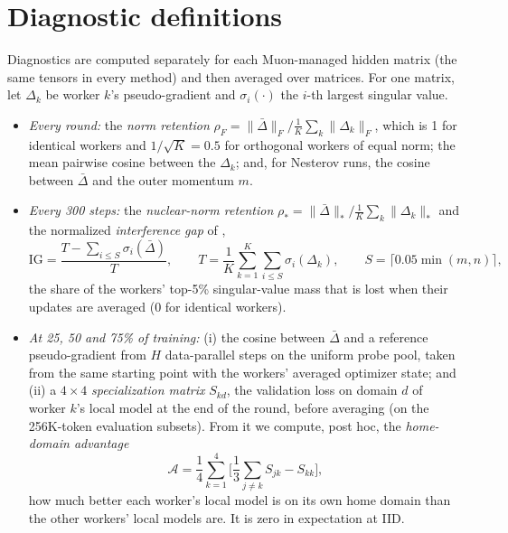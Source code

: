 \documentclass{article}
\begin{document}
\FloatBarrier  %
\section{Diagnostic definitions}\label{app:diagnostics}
Diagnostics are computed separately for each Muon-managed hidden matrix (the same tensors in every method) and then averaged over matrices. For one matrix, let $\Delta_k$ be worker $k$'s pseudo-gradient and $\sigma_i(\cdot)$ the $i$-th largest singular value.
\begin{itemize}
  \item \emph{Every round:} the \emph{norm retention} $\rho_F = \lVert\bar\Delta\rVert_F \big/ \frac1K\sum_k\lVert\Delta_k\rVert_F$, which is 1 for identical workers and $1/\sqrt{K}=0.5$ for orthogonal workers of equal norm; the mean pairwise cosine between the $\Delta_k$; and, for Nesterov runs, the cosine between $\bar\Delta$ and the outer momentum $m$.
  \item \emph{Every 300 steps:} the \emph{nuclear-norm retention} $\rho_* = \lVert\bar\Delta\rVert_* \big/ \frac1K\sum_k\lVert\Delta_k\rVert_*$ and the normalized \emph{interference gap} of \citet{therien2025muloco},
  \begin{equation}
    \mathrm{IG} = \frac{T - \sum_{i \le S}\sigma_i(\bar\Delta)}{T}, \qquad T = \frac1K\sum_{k=1}^{K}\sum_{i \le S}\sigma_i(\Delta_k), \qquad S = \lceil 0.05\min(m,n) \rceil,
  \end{equation}
  the share of the workers' top-5\% singular-value mass that is lost when their updates are averaged (0 for identical workers).
  \item \emph{At 25, 50 and 75\% of training:} (i) the cosine between $\bar\Delta$ and a reference pseudo-gradient from $H$ data-parallel steps on the uniform probe pool, taken from the same starting point with the workers' averaged optimizer state; and (ii) a $4\times4$ \emph{specialization matrix} $S_{kd}$, the validation loss on domain $d$ of worker $k$'s local model at the end of the round, before averaging (on the 256K-token evaluation subsets). From it we compute, post hoc, the \emph{home-domain advantage}
  \begin{equation}
    \mathcal{A} = \frac14 \sum_{k=1}^{4} \Big[ \frac13 \sum_{j \neq k} S_{jk} - S_{kk} \Big],
  \end{equation}
  how much better each worker's local model is on its own home domain than the other workers' local models are. It is zero in expectation at IID.
\end{itemize}
\end{document}
